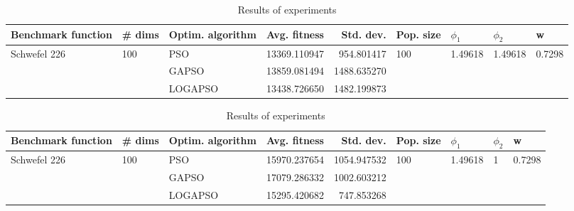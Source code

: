 \documentclass{article}
\begin{document}
\begin{table}
\centering
\caption{Results of experiments}
\begin{tabular}{lllrrllll}
\toprule
           Benchmark function &              \# dims & Optim. algorithm &  Avg. fitness &   Std. dev. &            Pop. size &               $\phi_{1}$ &               $\phi_{2}$ &                       w \\
\midrule
\multirow{3}{*}{Schwefel 226} & \multirow{3}{*}{100} &              PSO &  13369.110947 &  954.801417 & \multirow{3}{*}{100} & \multirow{3}{*}{1.49618} & \multirow{3}{*}{1.49618} & \multirow{3}{*}{0.7298} \\
                              &                      &            GAPSO &  13859.081494 & 1488.635270 &                      &                          &                          &                         \\
                              &                      &          LOGAPSO &  13438.726650 & 1482.199873 &                      &                          &                          &                         \\
\bottomrule
\end{tabular}
\end{table}
\begin{table}
\centering
\caption{Results of experiments}
\begin{tabular}{lllrrllll}
\toprule
           Benchmark function &              \# dims & Optim. algorithm &  Avg. fitness &   Std. dev. &            Pop. size &               $\phi_{1}$ &         $\phi_{2}$ &                       w \\
\midrule
\multirow{3}{*}{Schwefel 226} & \multirow{3}{*}{100} &              PSO &  15970.237654 & 1054.947532 & \multirow{3}{*}{100} & \multirow{3}{*}{1.49618} & \multirow{3}{*}{1} & \multirow{3}{*}{0.7298} \\
                              &                      &            GAPSO &  17079.286332 & 1002.603212 &                      &                          &                    &                         \\
                              &                      &          LOGAPSO &  15295.420682 &  747.853268 &                      &                          &                    &                         \\
\bottomrule
\end{tabular}
\end{table}
\end{document}
